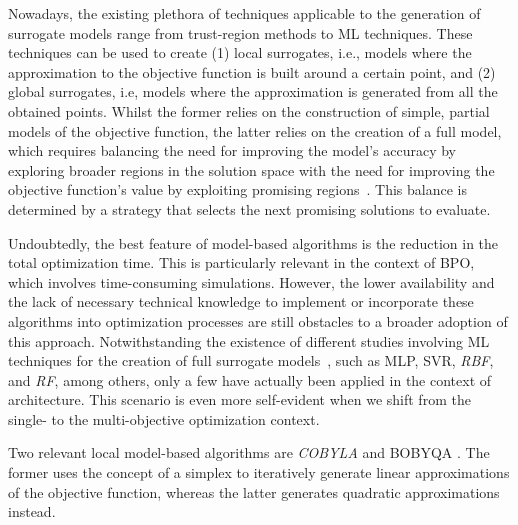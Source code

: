 	Nowadays, the existing plethora of techniques applicable to the generation of surrogate models range from trust-region methods to \ac{ML} techniques. These techniques can be used to create (1) local surrogates, i.e., models where the approximation to the objective function is built around a certain point, and (2) global surrogates, i.e, models where the approximation is generated from all the obtained points. Whilst the former relies on the construction of simple, partial models of the objective function, the latter relies on the creation of a full model, which requires balancing the need for improving the model's accuracy by exploring broader regions in the solution space with the need for improving the objective function's value by exploiting promising regions~\cite{Koziel2011}. This balance is determined by a strategy that selects the next promising solutions to evaluate. 
	
	Undoubtedly, the best feature of model-based algorithms is the reduction in the total optimization time. This is particularly relevant in the context of \ac{BPO}, which involves time-consuming simulations. However, the lower availability and the lack of necessary technical knowledge to implement or incorporate these algorithms into optimization processes are still obstacles to a broader adoption of this approach. Notwithstanding the existence of different studies involving \ac{ML} techniques for the creation of full surrogate models~\cite{Koziel2011, Forrester2009SBO}, such as \ac{MLP}, \ac{SVR}, \textit{\ac{RBF}}, and \textit{\ac{RF}}, among others, only a few have actually been applied in the context of architecture. This scenario is even more self-evident when we shift from the single- to the multi-objective optimization context.
	
	
	Two relevant local model-based algorithms are \textit{\ac{COBYLA}} and \ac{BOBYQA} \cite{Powell1994COBYLA, Powell2009BOBYQA}. The former uses the concept of a simplex to iteratively generate linear approximations of the objective function, whereas the latter generates quadratic approximations instead. %
	
